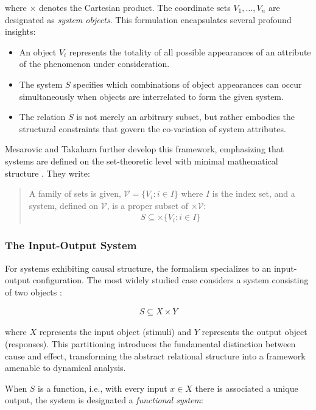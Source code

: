 where $\times$ denotes the Cartesian product. The coordinate sets $V_1, \ldots, V_n$ are designated as \emph{system objects}. This formulation encapsulates several profound insights:

\begin{itemize}
\item An object $V_i$ represents the totality of all possible appearances of an attribute of the phenomenon under consideration.
\item The system $S$ specifies which combinations of object appearances can occur simultaneously when objects are interrelated to form the given system.
\item The relation $S$ is not merely an arbitrary subset, but rather embodies the structural constraints that govern the co-variation of system attributes.
\end{itemize}

Mesarovic and Takahara further develop this framework, emphasizing that systems are defined on the set-theoretic level with minimal mathematical structure \citep{Mesarovic1975}. They write:

\begin{quote}
A family of sets is given, $\mathcal{V} = \{V_i : i \in I\}$ where $I$ is the index set, and a system, defined on $\mathcal{V}$, is a proper subset of $\times \mathcal{V}$:
\begin{align*}
S \subseteq \times \{V_i : i \in I\}
\end{align*}
\end{quote}

\subsubsection{The Input-Output System}

For systems exhibiting causal structure, the formalism specializes to an input-output configuration. The most widely studied case considers a system consisting of two objects \citep{Mesarovic1975}:

\begin{align*}
S \subseteq X \times Y
\end{align*}

where $X$ represents the input object (stimuli) and $Y$ represents the output object (responses). This partitioning introduces the fundamental distinction between cause and effect, transforming the abstract relational structure into a framework amenable to dynamical analysis.

When $S$ is a function, i.e., with every input $x \in X$ there is associated a unique output, the system is designated a \emph{functional system}:


